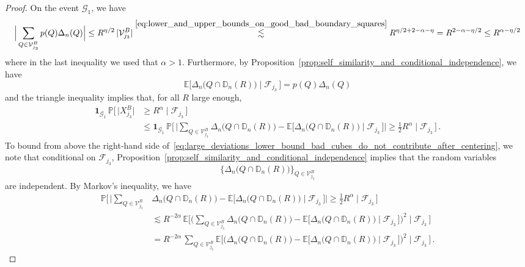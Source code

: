 \documentclass[11pt]{amsart}
\theoremstyle{definition}
\theoremstyle{remark}
\numberwithin{equation}{section}
\newcommand{\bD}{\mathbb D}
\newcommand{\bP}{\mathbb P}
\newcommand{\bE}{\mathbb E}
\begin{document}
	\begin{proof}
		On the event $\mathcal{G}_1$, we have
		\begin{equation*}
			\Big|\sum_{Q\in \mathcal{V}_{j_3}^{B}} p(Q) \Delta_n(Q)\Big| \leq R^{\eta/2} \,  |\mathcal{V}_{j_3}^{B}| \stackrel{\eqref{eq:lower_and_upper_bounds_on_good_bad_boundary_squares}}{\lesssim} R^{\eta/2+2-\alpha-\eta} = R^{2-\alpha-\eta/2} \le R^{\alpha-\eta/2}
		\end{equation*}
		where in the last inequality we used that $\alpha>1$. Furthermore, by Proposition~\ref{prop:self_similarity_and_conditional_independence}, we have
		\[
		\bE\big[ \Delta_{n}\big(Q\cap \bD_n(R)\big) \mid \mathcal{F}_{j_3} \, \big] = p(Q) \Delta_n(Q) 
		\]
		and the triangle inequality implies that, for all $R$ large enough, 
		\begin{align}
			\label{eq:large_deviations_lower_bound_bad_cubes_do_not_contribute_after_centering}
			\nonumber
			\mathbf{1}_{\mathcal{G}_1} \, \bP\Big[ \, \big|X_{j_3}^B\big| &\ge R^{\alpha} \mid \mathcal{F}_{j_3} \, \Big] \\ &\le \mathbf{1}_{\mathcal{G}_1} \, \bP\Big[ \, \Big|\sum_{Q\in \mathcal{V}_{j_3}^{B}} \Delta_{n}\big(Q\cap \bD_n(R)\big) - \bE\big[ \Delta_{n}\big(Q\cap \bD_n(R)\big) \mid \mathcal{F}_{j_3} \, \big] \Big| \ge \tfrac{1}{2}R^{\alpha} \mid \mathcal{F}_{j_3} \, \Big] \, .
		\end{align}
		To bound from above the right-hand side of~\eqref{eq:large_deviations_lower_bound_bad_cubes_do_not_contribute_after_centering}, we note that conditional on $\mathcal{F}_{j_3}$, Proposition~\ref{prop:self_similarity_and_conditional_independence} implies that the random variables $$\Big\{\Delta_n\big(Q\cap \bD_n(R) \big) \Big\}_{Q\in \mathcal{V}_{j_3}^B}$$
		are independent. By Markov's inequality, we have
		\begin{align}
			\label{eq:large_deviations_lower_bound_bad_cubes_do_not_contribute_after_centering_and_markov}
			\nonumber
			\bP\Big[ \, \Big|\sum_{Q\in \mathcal{V}_{j_3}^{B}} & \Delta_{n}\big(Q\cap \bD_n(R)\big) - \bE\big[ \Delta_{n}\big(Q\cap \bD_n(R)\big) \mid \mathcal{F}_{j_3} \, \big] \Big| \ge \tfrac{1}{2}R^{\alpha} \mid \mathcal{F}_{j_3} \, \Big] \\ \nonumber & \lesssim R^{-2\alpha} \, \bE\Big[\Big(\sum_{Q\in \mathcal{V}_{j_3}^{B}} \Delta_{n}\big(Q\cap \bD_n(R)\big) - \bE\big[ \Delta_{n}\big(Q\cap \bD_n(R)\big)\mid \mathcal{F}_{j_3} \, \big]\Big)^2 \mid \mathcal{F}_{j_3}\, \Big] \\ &= R^{-2\alpha} \,  \sum_{Q\in \mathcal{V}_{j_3}^{B}} \bE\Big[ \Big(\Delta_{n}\big(Q\cap \bD_n(R)\big) - \bE\big[ \Delta_{n}\big(Q\cap \bD_n(R)\big)\mid \mathcal{F}_{j_3} \, \big]\Big)^2 \mid \mathcal{F}_{j_3}\, \Big] \, .

\end{align}
\end{proof}
\end{document}

